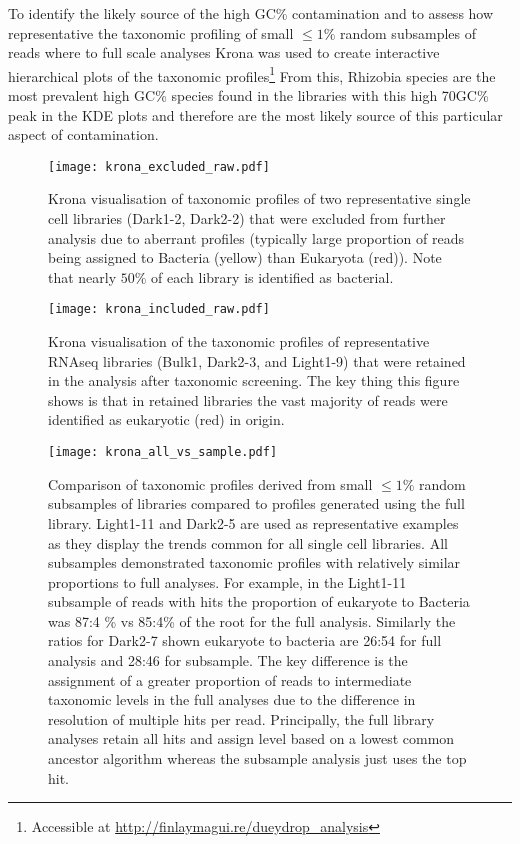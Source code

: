 To identify the likely source of the high GC\% contamination 
and to assess how representative the taxonomic profiling of small \(\leq1\%\) 
random
subsamples of reads where to full scale analyses Krona was used to 
create interactive hierarchical plots of the taxonomic profiles\footnote{
Accessible at \url{http://finlaymagui.re/dueydrop_analysis}} 
From this, Rhizobia species are the most prevalent high GC\% species found in the libraries
with this high 70GC\% peak in the KDE plots and therefore are the most likely source
of this particular aspect of contamination. 

\begin{figure}[h!]
    \texttt{[image: krona\_excluded\_raw.pdf]}
    \caption[Visualisation of taxonomically excluded libraries]{Krona visualisation of taxonomic profiles of two representative
        single cell libraries (Dark1-2, Dark2-2) that were excluded from further analysis due 
    to aberrant profiles (typically large proportion of reads being assigned
    to Bacteria (yellow) than Eukaryota (red)). Note that nearly \(50\%\) of each library is identified as bacterial.}
    \label{fig:krona_excluded}
\end{figure}

\begin{figure}[h!]
    \texttt{[image: krona\_included\_raw.pdf]}
    \caption[Visualisation of taxonomically included libraries]{
    Krona visualisation of the taxonomic profiles of representative 
    RNAseq libraries (Bulk1, Dark2-3, and Light1-9) that were retained 
    in the analysis after taxonomic screening.  The key thing this figure
    shows is that in retained libraries the vast majority of reads were 
    identified as eukaryotic (red) in origin.
    }
    \label{fig:krona_included}
\end{figure}


\begin{figure}[hp]
    \texttt{[image: krona\_all\_vs\_sample.pdf]}
    \caption[Comparison of subsamples to whole library taxonomic profiles]{Comparison of taxonomic profiles derived from small \(\leq1\%\)
        random subsamples of libraries compared to profiles generated using the
        full library.  Light1-11 and Dark2-5 are used as representative examples
        as they display the trends common for all single cell libraries. 
        All subsamples demonstrated taxonomic profiles with relatively similar
        proportions to full analyses.  For example, in the Light1-11 subsample
        of reads with hits the proportion of eukaryote to Bacteria was 87:4 
        \% vs 85:4\% of the root for the full analysis. Similarly the ratios
        for Dark2-7 shown eukaryote to bacteria are 26:54 for full analysis
        and 28:46 for subsample. 
        The key difference is the assignment of a greater proportion of reads to 
        intermediate taxonomic levels in the full analyses due to the difference in 
        resolution of multiple hits per read.  Principally, the full library analyses
        retain all hits and assign level based on a lowest common ancestor algorithm
        whereas the subsample analysis just uses the top hit.
    }
    \label{fig:krona_sample_vs_full}
\end{figure}

